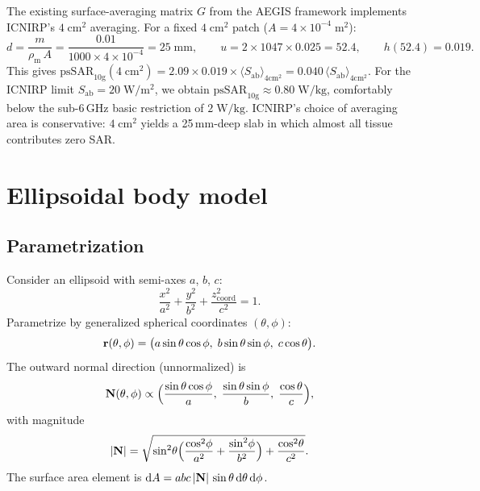 \documentclass[11pt,a4paper]{article}
\theoremstyle{definition}
\theoremstyle{remark}
\newcommand{\Sab}{S_{\mathrm{ab}}}
\newcommand{\psSAR}{\ensuremath{\mathrm{psSAR}_{10\mathrm{g}}}}
\newcommand{\rhom}{\rho_{\mathrm{m}}}
\begin{document}
The existing surface-averaging matrix $G$ from the AEGIS framework implements
ICNIRP's $4\;\mathrm{cm}^2$ averaging. For a fixed $4\;\mathrm{cm}^2$ patch
($A = 4 \times 10^{-4}\;\mathrm{m}^2$):
\[
  d = \frac{m}{\rhom\,A}
    = \frac{0.01}{1000 \times 4 \times 10^{-4}}
    = 25\;\mathrm{mm},
  \qquad
  u = 2 \times 1047 \times 0.025 = 52.4,
  \qquad
  h(52.4) = 0.019.
\]
This gives $\psSAR(4\;\mathrm{cm}^2) = 2.09 \times 0.019 \times
\langle\Sab\rangle_{4\mathrm{cm}^2} = 0.040\,\langle\Sab\rangle_{4\mathrm{cm}^2}$.
For the ICNIRP limit $\Sab = 20\;\mathrm{W/m^2}$, we obtain
$\psSAR \approx 0.80\;\mathrm{W/kg}$, comfortably below the sub-6\,GHz basic
restriction of $2\;\mathrm{W/kg}$.  ICNIRP's choice of averaging area is
conservative: $4\;\mathrm{cm}^2$ yields a 25\,mm-deep slab in which almost all
tissue contributes zero SAR.


\section{Ellipsoidal body model}
\label{sec:ellipsoid}

\subsection{Parametrization}

Consider an ellipsoid with semi-axes $a$, $b$, $c$:
\begin{equation}\label{eq:ellipsoid}
  \frac{x^2}{a^2} + \frac{y^2}{b^2} + \frac{z_{\mathrm{coord}}^2}{c^2} = 1.
\end{equation}
Parametrize by generalized spherical coordinates $(\theta, \phi)$:
\begin{equation}\label{eq:ellipsoid-param}
  \vb{r}(\theta,\phi)
  = \bigl(a\sin\theta\cos\phi,\;b\sin\theta\sin\phi,\;c\cos\theta\bigr).
\end{equation}
The outward normal direction (unnormalized) is
\begin{equation}\label{eq:N-unnorm}
  \vb{N}(\theta,\phi)
  \propto \Bigl(\frac{\sin\theta\cos\phi}{a},\;
  \frac{\sin\theta\sin\phi}{b},\;\frac{\cos\theta}{c}\Bigr),
\end{equation}
with magnitude
\begin{equation}\label{eq:N-mag}
  |\vb{N}|
  = \sqrt{\sin^2\!\theta\Bigl(\frac{\cos^2\!\phi}{a^2}
    + \frac{\sin^2\!\phi}{b^2}\Bigr) + \frac{\cos^2\!\theta}{c^2}}.
\end{equation}
The surface area element is $\mathrm{d}A = abc\,|\vb{N}|\,\sin\theta\,\mathrm{d}\theta\,\mathrm{d}\phi$.
\end{document}

